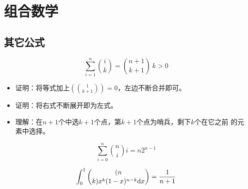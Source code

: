 \chapter{组合数学}



\section{其它公式}
\begin{theorem}
    \begin{displaymath}
        \sum_{i=1}^n{i \choose k}={n+1 \choose k+1} ~k>0
    \end{displaymath}
\end{theorem}
\begin{itemize}
    \item 证明：将等式加上$(1\choose k+1)=0$，左边不断合并即可。
    \item 证明：将右式不断展开即为左式。
    \item 理解：在$n+1$个中选$k+1$个点，第$k+1$个点为哨兵，剩下$k$个在它之前
    的元素中选择。
\end{itemize}
\begin{theorem}
    \begin{displaymath}
        \sum_{i=0}^n{{n\choose i}i}=n2^{n-1}
    \end{displaymath}
\end{theorem}
\begin{theorem}
    \begin{displaymath}
        \int_0^1{(n \choose k)x^k(1-x)^{n-k}\mathrm{d} x}=\frac{1}{n+1}
    \end{displaymath}
\end{theorem}
